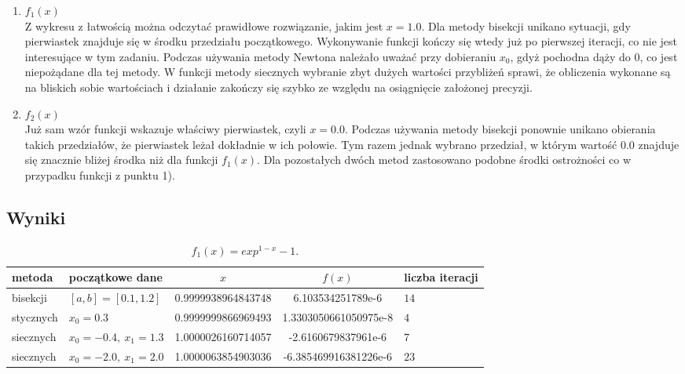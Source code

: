 \documentclass{classrep}
\begin{document}
	
		\begin{enumerate}[1)]
			\item $f_1(x)$ \\
			Z wykresu z łatwością można odczytać prawidłowe rozwiązanie, jakim jest $x=1.0$.
			Dla metody bisekcji unikano sytuacji, gdy pierwiastek znajduje się w środku przedziału początkowego. Wykonywanie funkcji kończy się wtedy już po pierwszej iteracji, co nie jest interesujące w tym zadaniu.
			Podczas używania metody Newtona należało uważać przy dobieraniu $x_0$, gdyż pochodna dąży do $0$, co jest niepożądane dla tej metody.
			W funkcji metody siecznych wybranie zbyt dużych wartości przybliżeń sprawi, że obliczenia wykonane są na bliskich sobie wartościach i działanie zakończy się szybko ze względu na osiągnięcie założonej precyzji.
			
			\item $f_2(x)$ \\
			Już sam wzór funkcji wskazuje właściwy pierwiastek, czyli $x=0.0$. Podczas używania metody bisekcji ponownie unikano obierania takich przedziałów, że pierwiastek leżał dokładnie w ich połowie. Tym razem jednak wybrano przedział, w którym wartość $0.0$ znajduje się znacznie bliżej środka niż dla funkcji $f_1(x)$. 
		Dla pozostałych dwóch metod zastosowano podobne środki ostrożności co w przypadku funkcji z punktu 1).
		\end{enumerate}
		
		
	\subsection{Wyniki}
		\begin{table}[!hpbt]
        		\centering
        		\footnotesize
			\begin{tabular}{llSSl} \toprule
				{metoda} & {początkowe dane} &{$x$} & {$f(x)$} & {liczba iteracji}\\ \midrule
				bisekcji & $[a,b]=[0.1,1.2]$ & 0.9999938964843748 & 6.103534251789e-6 & $14$ \\ 
	 			stycznych & $x_0=0.3$ & 0.9999999866969493 & 1.3303050661050975e-8 & $4$ \\
	 			siecznych & $x_0=-0.4,~x_1=1.3$ & 1.0000026160714057 & -2.6160679837961e-6 & $7$ \\ 
	 			siecznych & $x_0=-2.0,~x_1=2.0$ & 1.0000063854903036 & -6.385469916381226e-6 & $23$ \\ \bottomrule
	 		\end{tabular}
	 		\caption{$f_1(x)=exp^{1-x}-1$.}
			\label{table:3}
		\end{table}
			
\end{document}
